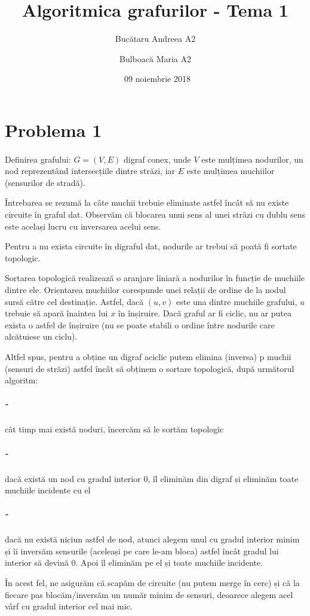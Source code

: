 \documentclass[paper=a4, fontsize=12pt]{scrartcl}
\title{\textbf{Algoritmica grafurilor - Tema 1}}
\author{Bucătaru Andreea A2 \and Bulboacă Maria A2}
\date{\normalsize\ 09 noiembrie 2018}
\begin{document}
\maketitle

\section*{Problema 1}
\paragraph{}
Definirea grafului: $G=\left(V,E\right)$ digraf conex, unde $V$ este mulțimea
nodurilor, un nod reprezentând intersecțiile dintre străzi,
iar $E$ este mulțimea muchiilor (sensurilor de stradă).

Întrebarea se rezumă la câte muchii trebuie eliminate astfel încât să nu existe
circuite în graful dat. Observăm că blocarea unui sens al unei străzi cu dublu sens este același lucru cu inversarea acelui sens.

Pentru a nu exista circuite în digraful dat, nodurile ar trebui să poată fi 
sortate topologic.

Sortarea topologică realizează o aranjare liniară a nodurilor în funcție de
muchiile dintre ele. Orientarea muchiilor corespunde unei relații de ordine
de la nodul sursă către cel destinație. Astfel, dacă $(u, v)$ este una dintre
muchiile grafului, $u$ trebuie să apară înaintea lui $x$ în înșiruire. Dacă
graful ar fi ciclic, nu ar putea exista o astfel de înșiruire (nu se poate
stabili o ordine între nodurile care alcătuiesc un ciclu).

Altfel spus, pentru a obține un digraf aciclic putem elimina (inversa) p
muchii (sensuri de străzi) astfel încât să obținem o sortare topologică,
după următorul algoritm:
\vspace{-1.3em}
\subparagraph{-}
cât timp mai există noduri, încercăm să le sortăm topologic
\vspace{-1.3em}
\subparagraph{-}
dacă există un nod cu gradul interior 0, îl eliminăm din digraf și eliminăm toate muchiile incidente cu el
\vspace{-1.3em}
\subparagraph{-}
dacă nu există niciun astfel de nod, atunci alegem unul cu gradul interior minim și îi inversăm sensurile (aceleași pe care le-am bloca) astfel încât gradul lui interior să devină 0. Apoi îl eliminăm pe el și toate muchiile incidente.

În acest fel, ne asigurăm că scapăm de circuite (nu putem merge în cerc) și că la fiecare pas blocăm/inversăm un număr minim de sensuri, deoarece alegem acel vârf cu gradul interior cel mai mic.
\end{document}
